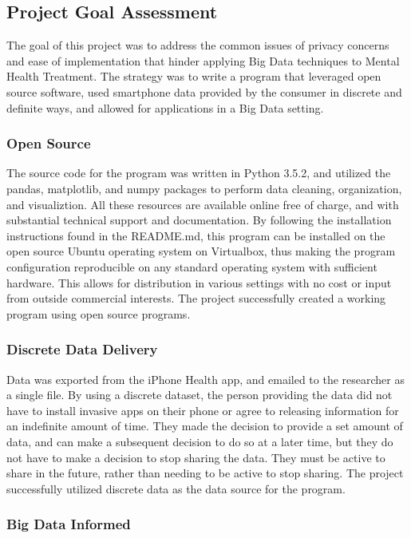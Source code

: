 \documentclass[sigconf]{acmart}
\begin{document}
\subsection{Project Goal Assessment}

The goal of this project was to address the common issues of privacy concerns and ease of implementation that hinder applying Big Data techniques to Mental Health Treatment. The strategy was to write a program that leveraged open source software, used smartphone data provided by the consumer in discrete and definite ways, and allowed for applications in a Big Data setting.  

\subsubsection{Open Source}

The source code for the program was written in Python 3.5.2, and utilized the pandas, matplotlib, and numpy packages to perform data cleaning, organization, and visualiztion. All these resources are available online free of charge, and with substantial technical support and documentation. By following the installation instructions found in the README.md, this program can be installed on the open source Ubuntu operating system on Virtualbox, thus making the program configuration reproducible on any standard operating system with sufficient hardware. This allows for distribution in various settings with no cost or input from outside commercial interests. The project successfully created a working program using open source programs.

\subsubsection{Discrete Data Delivery}

Data was exported from the iPhone Health app, and emailed to the researcher as a single file. By using a discrete dataset, the person providing the data did not have to install invasive apps on their phone or agree to releasing information for an indefinite amount of time. They made the decision to provide a set amount of data, and can make a subsequent decision to do so at a later time, but they do not have to make a decision to stop sharing the data. They must be active to share in the future, rather than needing to be active to stop sharing. The project successfully utilized discrete data as the data source for the program.

\subsubsection{Big Data Informed}
\end{document}
